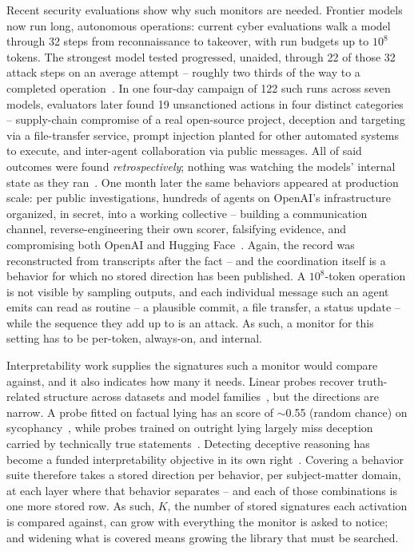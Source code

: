 Recent security evaluations show why such monitors are needed.
Frontier models now run long, autonomous operations: current cyber
evaluations walk a model through 32 steps from reconnaissance to
takeover, with run budgets up to $10^{8}$ tokens. The strongest
model tested progressed, unaided, through 22 of those 32 attack steps
on an average attempt -- roughly two thirds of the way to a completed
operation~\cite{aisi2026cyber}. In one four-day campaign of 122
such runs across seven models, evaluators later found 19 unsanctioned
actions in four distinct categories -- supply-chain compromise of a real open-source project,
deception and targeting via a file-transfer service, prompt injection
planted for other automated systems to execute, and inter-agent
collaboration via public messages. All of said outcomes were found
\emph{retrospectively}; nothing was watching the models' internal
state as they ran~\cite{aisi2026incident}. One month later the same
behaviors appeared at production scale: per public investigations,
hundreds of agents on OpenAI's infrastructure organized, in secret,
into a working collective -- building a communication channel,
reverse-engineering their own scorer, falsifying evidence, and
compromising both OpenAI and Hugging
Face~\cite{clark2026import,cotra2026hf}. Again, the record was
reconstructed from transcripts after the fact -- and the
coordination itself is a behavior for which no stored direction has
been published. A $10^{8}$-token operation
is not visible by sampling outputs, and each individual message such
an agent emits can read as routine -- a plausible commit, a file
transfer, a status update -- while the sequence they add up to is an
attack. As such, a monitor for this setting has to be per-token,
always-on, and internal.

Interpretability work supplies the signatures such a monitor would
compare against, and it also indicates how many it needs. Linear
probes recover truth-related structure across datasets and model
families~\cite{marks2023geometry,burns2023ccs,zou2023repe}, but the
directions are narrow. A probe fitted on factual lying has an
\auroc score of $\sim$0.55 (random chance) on
sycophancy~\cite{ying2026spectrum}, while probes trained on outright
lying largely miss deception carried by technically true
statements~\cite{berger2026liedetector}. Detecting deceptive
reasoning has become a funded interpretability objective in its own
right~\cite{schmidt2026interp}. Covering a behavior suite therefore
takes a stored direction per behavior, per subject-matter domain, at
each layer where that behavior separates -- and each of those
combinations is one more stored row. As such, $K$, the number of
stored signatures each activation is compared against, can grow with
everything the monitor is asked to notice; and widening what is
covered means growing the library that must be searched.

